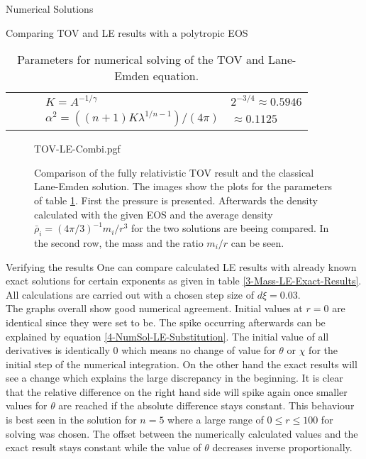 \begin{section}{Numerical Solutions}
\begin{subsection}{Comparing TOV and LE results with a polytropic EOS}
\begin{table}[H]
\begin{tabular}{@{}llcll@{}}
		&&& $K=A^{-1/\gamma}$ & $2^{-3/4}\approx0.5946$\\
		&&& $\alpha^2=((n+1)K\lambda^{1/n-1})/(4\pi)$ & $\approx0.1125$\\
		\bottomrule
	\end{tabular}
	\caption[Numerical Parameters for TOV and Lane-Emden equation]{Parameters for numerical solving of the TOV and Lane-Emden equation.}
	\label{4-NumSol-TOVParameters}
\end{table}%
\begin{figure}[H]
	\centering
	{TOV-LE-Combi.pgf}
	\caption[Comparison TOV and LE equation]{Comparison of the fully relativistic TOV result and the classical Lane-Emden solution. The images show the plots for the parameters of table \ref{4-NumSol-TOVParameters}. First the pressure is presented. Afterwards the density calculated with the given EOS and the average density $\bar{\rho}_i=(4\pi/3)^{-1}m_i/r^3$ for the two solutions are beeing compared. In the second row, the mass and the ratio $m_i/r$ can be seen.}
	\label{4-NumSol-TOVEqEasyEOS}
\end{figure}
\end{subsection}
%
%
\begin{subsection}{Verifying the results}
\label{4-NumSol-Sec-Verifiying-the-results}
One can compare calculated LE results with already known exact  solutions for certain exponents as given in table \ref{3-Mass-LE-Exact-Results}. 
All calculations are carried out with a chosen step size of $d\xi=0.03$.\\
The graphs overall show good numerical agreement. 
Initial values at $r=0$ are identical since they were set to be. 
The spike occurring afterwards can be explained by equation \ref{4-NumSol-LE-Substitution}. 
The initial value of all derivatives is identically $0$ which means no change of value for $\theta$ or $\chi$ for the initial step of the numerical integration. 
On the other hand the exact results will see a change which explains the large discrepancy in the beginning.
It is clear that the relative difference on the right hand side will spike again once smaller values for $\theta$ are reached if the absolute difference stays constant. 
This behaviour is best seen in the solution for $n=5$ where a large range of $0\leq r\leq100$ for solving was chosen. 
The offset between the numerically calculated values and the exact result stays constant while the value of $\theta$ decreases inverse proportionally.
\begin{figure}[H]

\end{figure}
\end{subsection}
\end{section}
